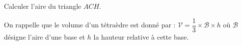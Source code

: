\begin{enumerate}
	Calculer l’aire du triangle $ACH$.
	
	On rappelle que le volume d’un tétraèdre est donné par : $\mathcal{V}=\dfrac13 \times \mathcal{B} \times h$ où $\mathcal{B}$ désigne l’aire d’une base et $h$ la hauteur relative à cette base.
\end{enumerate}

